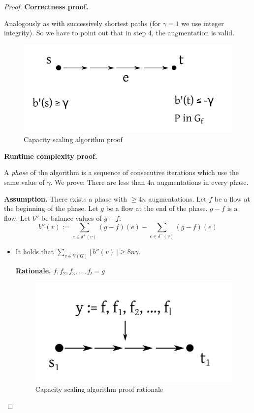 \documentclass[a4paper]{article}
\theoremstyle{definition}
\newcommand{\card}[1]{\left|\:\!#1\:\!\right|}
\begin{document}
\begin{proof}
  \textbf{Correctness proof.}

  Analogously as with successively shortest paths (for $\gamma = 1$ we use integer integrity).
  So we have to point out that in step 4, the augmentation is valid.

  \begin{figure}[ht]
   \begin{center}
    \includegraphics{img/capacity_scaling_algo_proof.pdf}
    \caption{Capacity scaling algorithm proof}
   \end{center}
  \end{figure}

  \textbf{Runtime complexity proof.}

  A \emph{phase} of the algorithm is a sequence of consecutive iterations which use the same value of $\gamma$. We prove: There are less than $4n$ augmentations in every phase.

  \textbf{Assumption.} There exists a phase with $\geq 4n$ augmentations. Let $f$ be a flow at the beginning of the phase. Let $g$ be a flow at the end of the phase.
  $g-f$ is a flow. Let $b''$ be balance values of $g-f$:
  \[
    b''(v) := \sum_{e \in \delta^+(v)} (g - f)(e) - \sum_{e \in \delta^-(v)} (g - f)(e)
  \]
  \clearpage
  \begin{itemize}
    \item It holds that $\sum_{v \in V(G)} \card{b''(v)} \geq 8n\gamma$.

      \textbf{Rationale.} $f, f_2, f_3, \ldots, f_l = g$

      \begin{figure}[ht]
       \begin{center}
        \includegraphics{img/capacity_scaling_algo_proof_rationale.pdf}
        \caption{Capacity scaling algorithm proof rationale}
       \end{center}
      \end{figure}


\end{itemize}
\end{proof}
\end{document}
